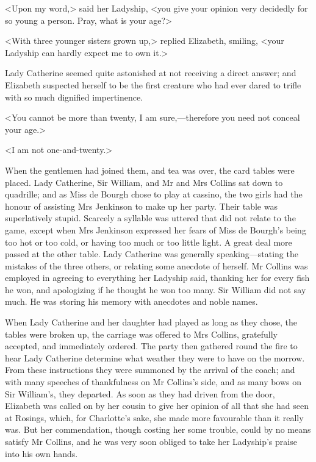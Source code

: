 <Upon my word,> said her Ladyship, <you give your opinion very decidedly for so young a person. Pray, what is your age?>

<With three younger sisters grown up,> replied Elizabeth, smiling, <your Ladyship can hardly expect me to own it.>

Lady Catherine seemed quite astonished at not receiving a direct answer; and Elizabeth suspected herself to be the first creature who had ever dared to trifle with so much dignified impertinence.

<You cannot be more than twenty, I am sure,—therefore you need not conceal your age.>

<I am not one-and-twenty.>

When the gentlemen had joined them, and tea was over, the card tables were placed. Lady Catherine, Sir William, and Mr and Mrs Collins sat down to quadrille; and as Miss de Bourgh chose to play at cassino, the two girls had the honour of assisting Mrs Jenkinson to make up her party. Their table was superlatively stupid. Scarcely a syllable was uttered that did not relate to the game, except when Mrs Jenkinson expressed her fears of Miss de Bourgh's being too hot or too cold, or having too much or too little light. A great deal more passed at the other table. Lady Catherine was generally speaking—stating the mistakes of the three others, or relating some anecdote of herself. Mr Collins was employed in agreeing to everything her Ladyship said, thanking her for every fish he won, and apologizing if he thought he won too many. Sir William did not say much. He was storing his memory with anecdotes and noble names.

When Lady Catherine and her daughter had played as long as they chose, the tables were broken up, the carriage was offered to Mrs Collins, gratefully accepted, and immediately ordered. The party then gathered round the fire to hear Lady Catherine determine what weather they were to have on the morrow. From these instructions they were summoned by the arrival of the coach; and with many speeches of thankfulness on Mr Collins's side, and as many bows on Sir William's, they departed. As soon as they had driven from the door, Elizabeth was called on by her cousin to give her opinion of all that she had seen at Rosings, which, for Charlotte's sake, she made more favourable than it really was. But her commendation, though costing her some trouble, could by no means satisfy Mr Collins, and he was very soon obliged to take her Ladyship's praise into his own hands.
